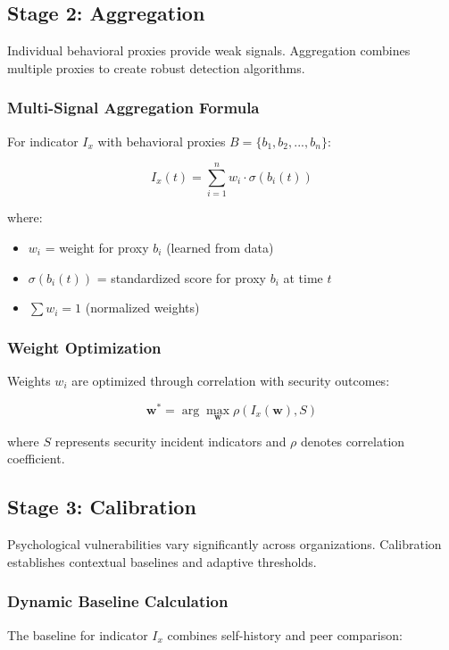 \documentclass[11pt, onecolumn]{article}
\begin{document}
\subsection{Stage 2: Aggregation}

Individual behavioral proxies provide weak signals. Aggregation combines multiple proxies to create robust detection algorithms.

\subsubsection{Multi-Signal Aggregation Formula}

For indicator $I_x$ with behavioral proxies $B = \{b_1, b_2, ..., b_n\}$:

$$I_x(t) = \sum_{i=1}^{n} w_i \cdot \sigma(b_i(t))$$

where:
\begin{itemize}
\item $w_i$ = weight for proxy $b_i$ (learned from data)
\item $\sigma(b_i(t))$ = standardized score for proxy $b_i$ at time $t$
\item $\sum w_i = 1$ (normalized weights)
\end{itemize}

\subsubsection{Weight Optimization}

Weights $w_i$ are optimized through correlation with security outcomes:

$$\mathbf{w}^* = \arg\max_{\mathbf{w}} \rho(I_x(\mathbf{w}), S)$$

where $S$ represents security incident indicators and $\rho$ denotes correlation coefficient.

\subsection{Stage 3: Calibration}

Psychological vulnerabilities vary significantly across organizations. Calibration establishes contextual baselines and adaptive thresholds.

\subsubsection{Dynamic Baseline Calculation}

The baseline for indicator $I_x$ combines self-history and peer comparison:
\end{document}
